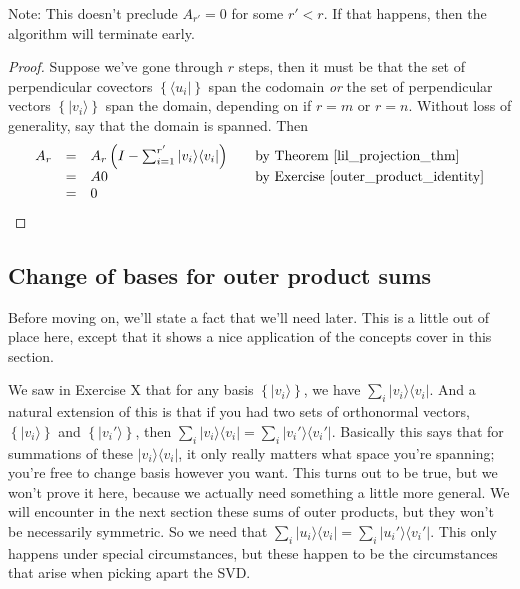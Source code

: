 \documentclass{amsbook}
\begin{document}
Note:  This doesn't preclude $A_{r'}=0$ for some $r'<r$.  If that happens, then the algorithm will terminate early.

\begin{proof}
Suppose we've gone through $r$ steps, then it must be that the set of perpendicular covectors $\left\{\langle u _i|\right\}$ span the codomain {\em or} the set of perpendicular vectors $\left\{| v _i\rangle\right\}$ span the domain, depending on if $r=m$ or $r=n$.  Without loss of generality, say that the domain is spanned.  Then 
$$
\begin{array}{rcll}
A_r&=&A_r\left(I-\sum_{i=1}^{r'}| v _i\rangle\langle v _i|\right)&\quad\text{by Theorem \ref{lil_projection_thm}}\\
&=&A0&\quad\text{by Exercise \ref{outer_product_identity}}\\
&=&0&
\end{array}
$$
\end{proof}

\subsection{Change of bases for outer product sums}

Before moving on, we'll state a fact that we'll need later.  This is a little out of place here, except that it shows a nice application of the concepts cover in this section.

We saw in Exercise X that for any basis $\left\{|v_i\rangle\right\}$, we have $\sum_i|v_i\rangle\langle v_i|$.  And a natural extension of this is that if you had two sets of orthonormal vectors, $\left\{|v_i\rangle\right\}$ and $\left\{|v_i'\rangle\right\}$, then $\sum_i|v_i\rangle\langle v_i|=\sum_i|v_i'\rangle\langle v_i'|$.  Basically this says that for summations of these $|v_i\rangle\langle v_i|$, it only really matters what space you're spanning; you're free to change basis however you want.  This turns out to be true, but we won't prove it here, because we actually need something a little more general.  We will encounter in the next section these sums of outer products, but they won't be necessarily symmetric.  So we need that $\sum_i|u_i\rangle\langle v_i|=\sum_i|u_i'\rangle\langle v_i'|$.  This only happens under special circumstances, but these happen to be the circumstances that arise when picking apart the SVD.
\end{document}
